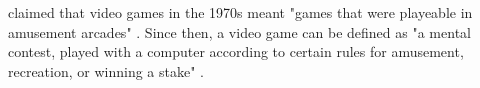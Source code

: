 \documentclass[a4paper,11.5pt]{report}
\numberwithin{figure}{section}
\numberwithin{table}{section}
\numberwithin{equation}{section}
\numberwithin{equation}{section}
\begin{document}
\citeauthor{Botturi2009} claimed that video games in the 1970s meant "games that were playeable in amusement arcades" \citep{Botturi2009}. Since then, a video game can be defined as "a mental contest, played with a computer according to certain rules for amusement, recreation, or winning a stake" \citep{Zyda2005}.






\end{document}
